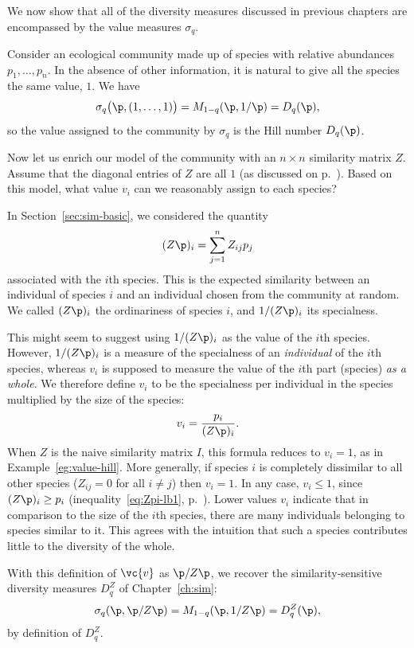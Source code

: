 We now show that all of the diversity measures discussed in
previous chapters are encompassed by the value measures $\sigma_q$.

\begin{example}
Consider an ecological community made up of species with relative abundances
$p_1, \ldots, p_n$.  In the absence of other information, it is
natural to give all the species the same value, $1$.  We have
\[
\sigma_q\bigl( \p, (1, \ldots, 1)\bigr)
=
M_{1 - q}(\p, 1/\p)
=
D_q(\p),
\]
so the value assigned to the community by $\sigma_q$ is the Hill
number $D_q(\p)$.
\end{example}

\begin{example}
Now let us enrich our model of the community with an $n \times n$
similarity matrix $Z$.  Assume that the diagonal entries of $Z$ are all $1$
(as discussed on p.~\pageref{p:Z1}).  Based on this model, what value $v_i$
can we 
reasonably assign to each species?

In Section~\ref{sec:sim-basic}, we considered the quantity 
\[
(Z\p)_i
=
\sum_{j = 1}^n Z_{ij} p_j
\]
associated with the $i$th species.  This is the expected similarity between
an individual of species $i$ and an individual chosen from the community at
random.  We called $(Z\p)_i$ the ordinariness of species $i$, and
$1/(Z\p)_i$ its specialness.%
%

This might seem to suggest using $1/(Z\p)_i$ as the value of the $i$th
species.  However, $1/(Z\p)_i$ is a measure of the specialness of an
\emph{individual} of the $i$th species, whereas $v_i$ is supposed to
measure the value of the $i$th part (species) \emph{as a whole}.  We
therefore define $v_i$%
%
%
to be the specialness per individual
in the species multiplied by the size of the species:
\[
v_i 
=
\frac{p_i}{(Z\p)_i}.
\]
When $Z$ is the naive similarity matrix $I$, this formula reduces to $v_i =
1$, as in Example~\ref{eg:value-hill}.  More generally, if species $i$ is
completely dissimilar to all other species ($Z_{ij} = 0$ for all $i \neq
j$) then $v_i = 1$.  In any case, $v_i \leq 1$, since $(Z\p)_i \geq p_i$ 
(inequality~\eqref{eq:Zpi-lb1}, p.~\pageref{eq:Zpi-lb1}).  Lower values
$v_i$ indicate that in comparison to the size of the $i$th species, there
are many individuals belonging to species similar to it.  This agrees with
the intuition that such a species contributes little to the diversity of
the whole.

With this definition of $\vc{v}$ as $\p/Z\p$, we recover the
similarity-sensitive diversity measures $D_q^Z$ of Chapter~\ref{ch:sim}:
\[
\sigma_q(\p, \p/Z\p)
=
M_{1 - q}(\p, 1/Z\p)
=
D_q^Z(\p),
\]
by definition of $D_q^Z$.
\end{example}

